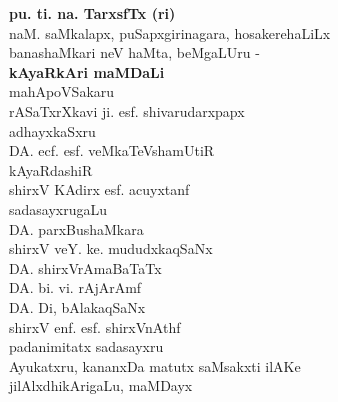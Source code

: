 \begin{center}
{\Large\bf pu. ti. na. TarxsfTx (ri)}\\[3pt]
naM.  saMkalapx, puSapxgirinagara, hosakerehaLiLx\\
banashaMkari neV haMta, beMgaLUru - \\[10pt]
{\large\bf kAyaRkAri maMDaLi}\\[7pt]
mahApoVSakaru\\[3pt]
rASaTxrXkavi ji. esf. shivarudarxpapx\\[15pt]
adhayxkaSxru\\[3pt]
DA. ecf. esf. veMkaTeVshamUtiR\\[15pt]
kAyaRdashiR\\
shirxV KAdirx esf. acuyxtanf\\[15pt]
sadasayxrugaLu\\[5pt]
DA. parxBushaMkara\\[3pt]
shirxV veY. ke. mududxkaqSaNx\\[3pt]
DA. shirxVrAmaBaTaTx\\[3pt]
DA. bi. vi. rAjArAmf\\[3pt]
DA. Di, bAlakaqSaNx\\[3pt]
shirxV enf. esf. shirxVnAthf\\[15pt]
padanimitatx sadasayxru\\[3pt]
Ayukatxru, kananxDa matutx saMsakxti ilAKe\\[3pt]
jilAlxdhikArigaLu, maMDayx
\end{center}




